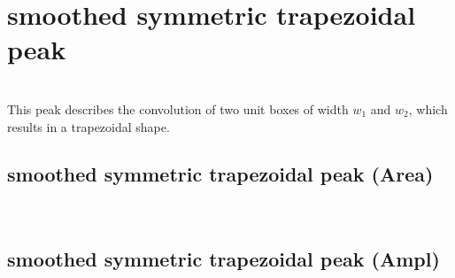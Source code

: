 \clearpage
\section{smoothed symmetric trapezoidal peak} ~\\
\label{sec:smoothedsymmetrictrapezoidal}
This peak describes the convolution of two unit boxes of width $w_1$ and $w_2$, which results in a trapezoidal shape. 
\subsection{smoothed symmetric trapezoidal peak (Area)} ~\\
\subsection{smoothed symmetric trapezoidal peak (Ampl)} ~\\
\clearpage
